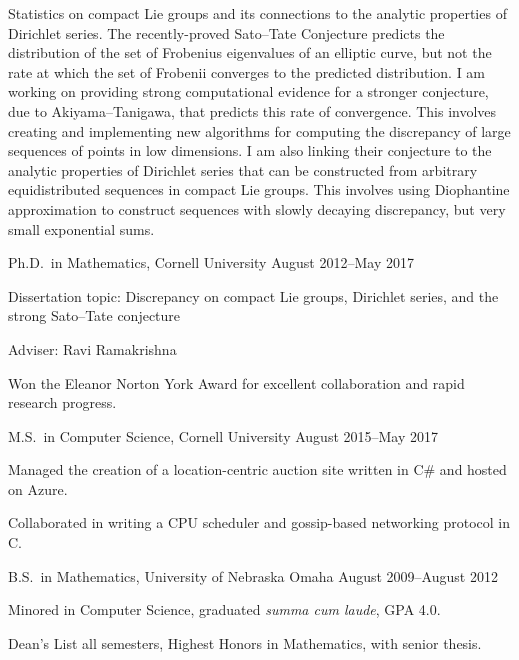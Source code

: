 \documentclass[11pt, letterpaper]{awesome-cv}
\begin{document}
\makecvheader






\begin{cvparagraph}
Statistics on compact Lie groups and its connections to the analytic properties 
of Dirichlet series. The recently-proved Sato--Tate Conjecture predicts the 
distribution of the set of Frobenius eigenvalues of an elliptic curve, but not 
the rate at which the set of Frobenii converges to the predicted distribution. 
I am working on providing strong computational evidence for a stronger 
conjecture, due to Akiyama--Tanigawa, that predicts this rate of convergence.
This involves creating and implementing new algorithms for computing the 
discrepancy of large sequences of points in low dimensions. 
I am also linking their conjecture to the analytic properties of Dirichlet 
series that can be constructed from arbitrary equidistributed sequences in 
compact Lie groups. This involves using Diophantine approximation to construct 
sequences with slowly decaying discrepancy, but very small exponential sums. 
\end{cvparagraph}






\begin{cventries}

\cventry
	{Ph.D.~in Mathematics, Cornell University}
	{}{}
	{August 2012--May 2017}
	{
		\begin{cvitems}
			\item{Dissertation topic: Discrepancy on compact Lie groups, Dirichlet series, and the strong Sato--Tate conjecture}
			\item{Adviser: Ravi Ramakrishna}
			\item{Won the Eleanor Norton York Award for excellent collaboration and rapid research progress.}
		\end{cvitems}
	}
	
\cventry
	{M.S.~in Computer Science, Cornell University}
	{}{}
	{August 2015--May 2017}
	{
		\begin{cvitems}
			\item{Managed the creation of a location-centric auction site written in C\# and hosted on Azure.}
			\item{Collaborated in writing a CPU scheduler and gossip-based networking protocol in C.}
		\end{cvitems}
	}
	
\cventry
	{B.S.~in Mathematics, University of Nebraska Omaha}
	{}{}
	{August 2009--August 2012}
	{
		\begin{cvitems}
			\item{Minored in Computer Science, graduated \emph{summa cum laude}, GPA 4.0.}
			\item{Dean's List all semesters, Highest Honors in Mathematics, with senior thesis.}
		\end{cvitems}
	}
	
\end{cventries}
\end{document}
